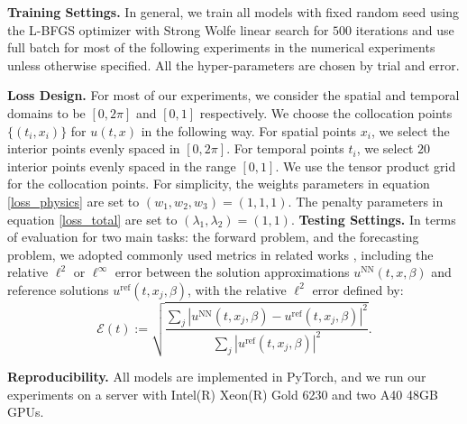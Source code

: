 \documentclass[preprint,11pt]{elsarticle}
\begin{document}
\textbf{Training Settings.} 
In general, we train all models with fixed random seed using the L-BFGS optimizer with Strong Wolfe linear search for $500$ iterations and use full batch for most of the following experiments in the numerical experiments unless otherwise specified. All the hyper-parameters are chosen by trial and error.  

\textbf{Loss Design.} For most of our experiments, we consider the spatial and temporal domains to be $[0,2\pi]$ and $[0,1]$ respectively. We choose the collocation points $\{(t_i, x_i)\}$ for $u(t,x)$ in the following way. For spatial points $x_i$, we select the interior points evenly spaced in $[0, 2\pi]$.  For temporal points $t_i$, we select $20$ interior points evenly spaced in the range $[0,1]$. We use the tensor product grid for the collocation points. For simplicity, the weights parameters in equation \eqref{loss_physics} are set to $(w_1, w_2, w_3) = (1,1,1)$. The penalty parameters in equation \eqref{loss_total} are set to $(\lambda_1, \lambda_2) = (1,1)$. 
\textbf{Testing Settings.}
In terms of evaluation for two main tasks: the forward problem, and the forecasting problem, we adopted commonly used metrics in related works \cite{jin2023asymptotic, zhao2023pinnsformer}, including the relative $\ell^2$ or $\ell^{\infty}$ error between the solution approximations $u^{\text{NN}}(t,x,\beta)$ and reference solutions $u^{\text{ref}}(t,x_j,\beta)$, with the relative $\ell^2$ error defined by: 
\begin{equation}
\mathcal{E}(t):=\sqrt{\frac{\sum_j|u^{\text{NN}}(t,x_j,\beta)-u^{\text{ref}}(t,x_j,\beta)|^2}{\sum_j|u^{\text{ref}}(t,x_j,\beta)|^2}}.
\end{equation}

\textbf{Reproducibility.} All models are implemented in PyTorch, and we run our experiments on a server with Intel(R) Xeon(R) Gold 6230 and two A40 48GB GPUs.
\end{document}
